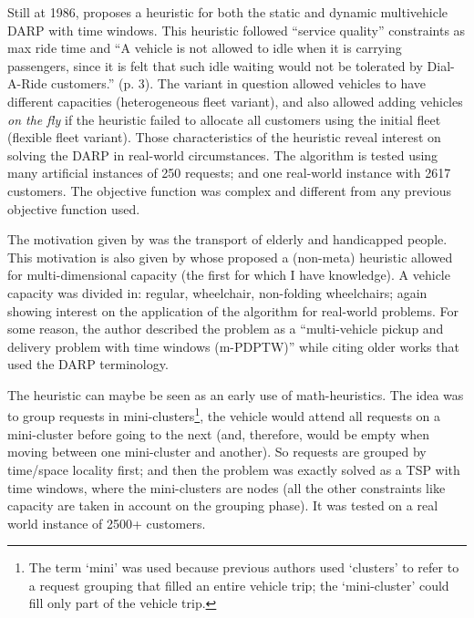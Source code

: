 \documentclass[english,plano-doutorado,twoside]{iiufrgs}
\begin{document}
Still at 1986, \cite{jaw_heuristic_1986} proposes a heuristic for both the static and dynamic multivehicle DARP with time windows. This heuristic followed ``service quality'' constraints as max ride time and ``A vehicle is not allowed to idle when it is carrying passengers, since it is felt that such idle waiting would not be tolerated by Dial-A-Ride customers.'' (p. 3). The variant in question allowed vehicles to have different capacities (heterogeneous fleet variant), and also allowed adding vehicles \textit{on the fly} if the heuristic failed to allocate all customers using the initial fleet (flexible fleet variant). Those characteristics of the heuristic reveal interest on solving the DARP in real-world circumstances. The algorithm is tested using many artificial instances of 250 requests; and one real-world instance with 2617 customers. The objective function was complex and different from any previous objective function used.

The motivation given by \cite{jaw_heuristic_1986} was the transport of elderly and handicapped people. This motivation is also given by \cite{ioachim_request_1995} whose proposed a (non-meta) heuristic allowed for multi-dimensional capacity (the first for which I have knowledge). A vehicle capacity was divided in: regular, wheelchair, non-folding wheelchairs; again showing interest on the application of the algorithm for real-world problems. For some reason, the author described the problem as a ``multi-vehicle pickup and delivery problem with time windows (m-PDPTW)'' while citing older works that used the DARP terminology.

The heuristic can maybe be seen as an early use of math-heuristics. The idea was to group requests in mini-clusters\footnote{The term `mini' was used because previous authors used `clusters' to refer to a request grouping that filled an entire vehicle trip; the `mini-cluster' could fill only part of the vehicle trip.}, the vehicle would attend all requests on a mini-cluster before going to the next (and, therefore, would be empty when moving between one mini-cluster and another). So requests are grouped by time/space locality first; and then the problem was exactly solved as a TSP with time windows, where the mini-clusters are nodes (all the other constraints like capacity are taken in account on the grouping phase). It was tested on a real world instance of 2500+ customers.
\end{document}
